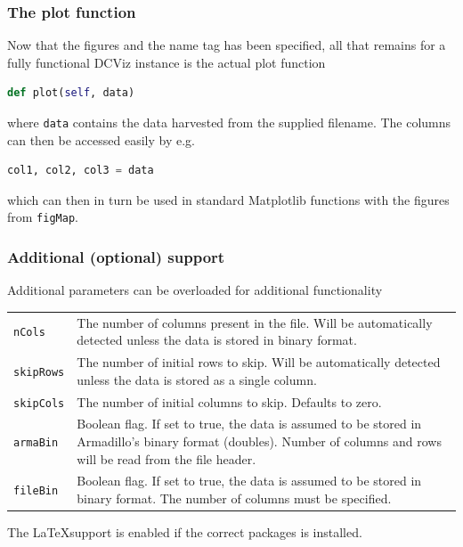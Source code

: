 \subsubsection{The plot function}

Now that the figures and the name tag has been specified, all that remains for a fully functional DCViz instance is the actual plot function

\begin{lstlisting}[language=Python, otherkeywords={self}]
def plot(self, data)
\end{lstlisting}

where \verb+data+ contains the data harvested from the supplied filename. The columns can then be accessed easily by e.g.

\begin{lstlisting}[language=Python]
col1, col2, col3 = data
\end{lstlisting}

which can then in turn be used in standard Matplotlib functions with the figures from \verb+figMap+.

\subsubsection{Additional (optional) support}

Additional parameters can be overloaded for additional functionality

\begin{small}
\begin{tabular}{lp{14cm}}
\verb+nCols+ & The number of columns present in the file. Will be automatically detected unless the data is stored in binary format.\\
\verb+skipRows+ & The number of initial rows to skip. Will be automatically detected unless the data is stored as a single column.\\
\verb+skipCols+ & The number of initial columns to skip. Defaults to zero.\\
\verb+armaBin+ & Boolean flag. If set to true, the data is assumed to be stored in Armadillo's binary format (doubles). Number of columns and rows will be read from the file header.\\
\verb+fileBin+ & Boolean flag. If set to true, the data is assumed to be stored in binary format. The number of columns must be specified.
\end{tabular}
\end{small}

The \LaTeX support is enabled if the correct packages is installed.

